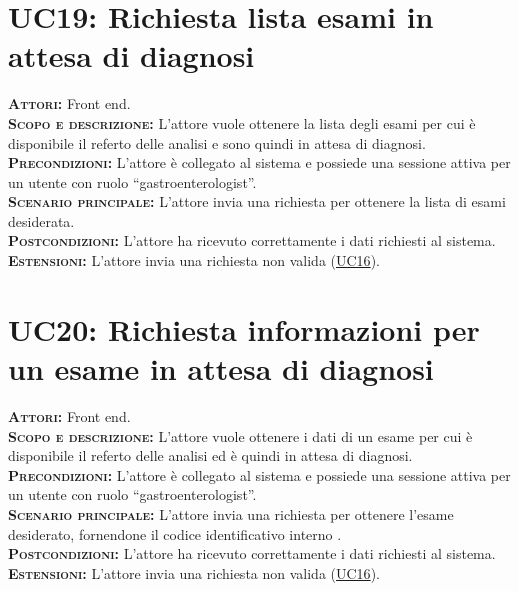 \section{UC19: Richiesta lista esami in attesa di diagnosi}
\label{sec:UC19}
\textsc{\textbf{Attori:}} Front end.\\
\textsc{\textbf{Scopo e descrizione:}} L'attore vuole ottenere la lista degli esami per cui è disponibile il referto delle analisi e sono quindi in attesa di diagnosi.\\
\textsc{\textsc{\textbf{Precondizioni:}}} L'attore è collegato al sistema e possiede una sessione attiva per un utente con ruolo ``gastroenterologist''.\\
\textsc{\textbf{Scenario principale:}} L'attore invia una richiesta per ottenere la lista di esami desiderata.\\
\textsc{\textbf{Postcondizioni:}} L'attore ha ricevuto correttamente i dati richiesti al sistema.\\
\textsc{\textbf{Estensioni:}} L'attore invia una richiesta non valida (\hyperref[sec:UC16]{UC16}).

\section{UC20: Richiesta informazioni per un esame in attesa di diagnosi}
\label{sec:UC20}
\textsc{\textbf{Attori:}} Front end.\\
\textsc{\textbf{Scopo e descrizione:}} L'attore vuole ottenere i dati di un esame  per cui è disponibile il referto delle analisi ed è quindi in attesa di diagnosi.\\
\textsc{\textsc{\textbf{Precondizioni:}}} L'attore è collegato al sistema e possiede una sessione attiva per un utente con ruolo ``gastroenterologist''.\\
\textsc{\textbf{Scenario principale:}}  L'attore invia una richiesta per ottenere l'esame desiderato, fornendone il codice identificativo interno .\\
\textsc{\textbf{Postcondizioni:}} L'attore ha ricevuto correttamente i dati richiesti al sistema.\\
\textsc{\textbf{Estensioni:}} L'attore invia una richiesta non valida (\hyperref[sec:UC16]{UC16}).

